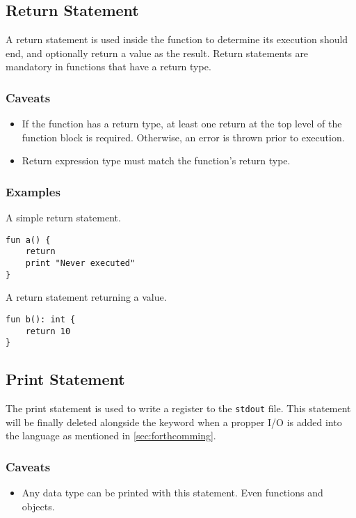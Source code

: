 \subsection{Return Statement}

A return statement is used inside the function to determine its execution should end, and optionally return a value as the result.
Return statements are mandatory in functions that have a return type.

\subsubsection{Caveats}

\begin{itemize}
    \item If the function has a return type, at least one return at the top level of the function block is required. Otherwise, an error
        is thrown prior to execution.
    \item Return expression type must match the function's return type.
\end{itemize}

\subsubsection{Examples}

A simple return statement.
\begin{lstlisting}
fun a() {
    return
    print "Never executed"
}
\end{lstlisting}
A return statement returning a value.
\begin{lstlisting}
fun b(): int {
    return 10
}
\end{lstlisting}

\subsection{Print Statement}
\label{sec:print_statement}

The print statement is used to write a register to the \texttt{stdout} file.
This statement will be finally deleted alongside the keyword when a propper I/O is added into the language as mentioned in \autoref{sec:forthcomming}.

\subsubsection{Caveats}

\begin{itemize}
    \item Any data type can be printed with this statement. Even functions and objects.
\end{itemize}

